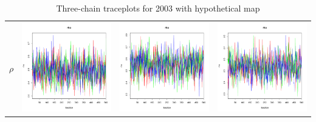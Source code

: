 \documentclass[letter,12pt]{article}
\begin{document}
\begin{table}
\begin{tabular}{cccc}
    $\rho$           & \includegraphics[width=.15\columnwidth]{../graphs/traceplots/2003d0v_7.pdf} &
                        \includegraphics[width=.15\columnwidth]{../graphs/traceplots/2003d0vbar_7.pdf} &
                         \includegraphics[width=.15\columnwidth]{../graphs/traceplots/2003d0wbar_7.pdf} \\
\end{tabular}
\caption{Three-chain traceplots for 2003 with hypothetical map}
\end{table}
\end{document}
